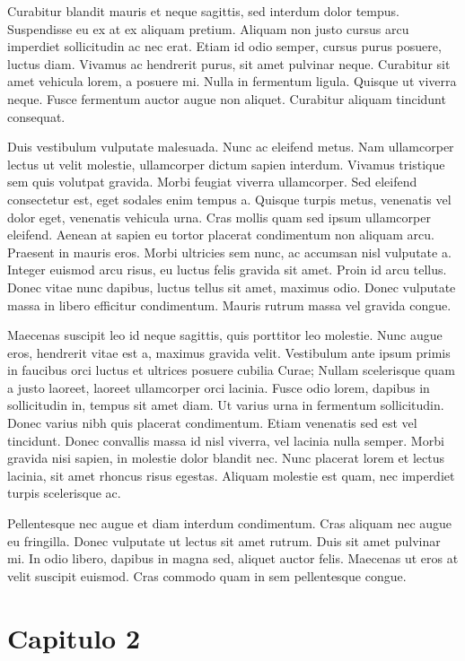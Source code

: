 \documentclass[12pt, twoside]{report}\usepackage[]{graphicx}\usepackage[]{color}
\begin{document}
Curabitur blandit mauris et neque sagittis, sed interdum dolor tempus. Suspendisse eu ex at ex aliquam pretium. Aliquam non justo cursus arcu imperdiet sollicitudin ac nec erat. Etiam id odio semper, cursus purus posuere, luctus diam. Vivamus ac hendrerit purus, sit amet pulvinar neque. Curabitur sit amet vehicula lorem, a posuere mi. Nulla in fermentum ligula. Quisque ut viverra neque. Fusce fermentum auctor augue non aliquet. Curabitur aliquam tincidunt consequat.

Duis vestibulum vulputate malesuada. Nunc ac eleifend metus. Nam ullamcorper lectus ut velit molestie, ullamcorper dictum sapien interdum. Vivamus tristique sem quis volutpat gravida. Morbi feugiat viverra ullamcorper. Sed eleifend consectetur est, eget sodales enim tempus a. Quisque turpis metus, venenatis vel dolor eget, venenatis vehicula urna. Cras mollis quam sed ipsum ullamcorper eleifend. Aenean at sapien eu tortor placerat condimentum non aliquam arcu. Praesent in mauris eros. Morbi ultricies sem nunc, ac accumsan nisl vulputate a. Integer euismod arcu risus, eu luctus felis gravida sit amet. Proin id arcu tellus. Donec vitae nunc dapibus, luctus tellus sit amet, maximus odio. Donec vulputate massa in libero efficitur condimentum. Mauris rutrum massa vel gravida congue.

Maecenas suscipit leo id neque sagittis, quis porttitor leo molestie. Nunc augue eros, hendrerit vitae est a, maximus gravida velit. Vestibulum ante ipsum primis in faucibus orci luctus et ultrices posuere cubilia Curae; Nullam scelerisque quam a justo laoreet, laoreet ullamcorper orci lacinia. Fusce odio lorem, dapibus in sollicitudin in, tempus sit amet diam. Ut varius urna in fermentum sollicitudin. Donec varius nibh quis placerat condimentum. Etiam venenatis sed est vel tincidunt. Donec convallis massa id nisl viverra, vel lacinia nulla semper. Morbi gravida nisi sapien, in molestie dolor blandit nec. Nunc placerat lorem et lectus lacinia, sit amet rhoncus risus egestas. Aliquam molestie est quam, nec imperdiet turpis scelerisque ac.

Pellentesque nec augue et diam interdum condimentum. Cras aliquam nec augue eu fringilla. Donec vulputate ut lectus sit amet rutrum. Duis sit amet pulvinar mi. In odio libero, dapibus in magna sed, aliquet auctor felis. Maecenas ut eros at velit suscipit euismod. Cras commodo quam in sem pellentesque congue.

\chapter{Capitulo 2}
\end{document}
